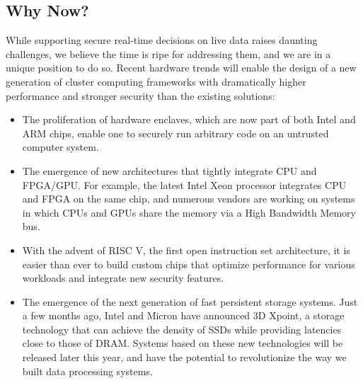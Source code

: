 \subsection{Why Now?}

While supporting secure real-time decisions on live data raises daunting challenges, we believe the time is ripe for addressing them, and we are in a unique position to do so. Recent hardware trends will enable the design of a new generation of cluster computing frameworks with dramatically higher performance and stronger security than the existing solutions: 

\begin{itemize}[noitemsep,topsep=0pt,parsep=0pt,partopsep=0pt]
\item The proliferation of hardware enclaves, which are now part of both Intel and ARM chips, enable one to securely run arbitrary code on an untrusted computer system.

\item The emergence of new architectures that tightly integrate CPU and FPGA/GPU. For example, the latest Intel Xeon processor integrates CPU and FPGA on the same chip, and numerous vendors are working on systems in which  CPUs and GPUs share the memory via a High Bandwidth Memory bus.  

\item With the advent of RISC V, the first open instruction set architecture, it is easier than ever to build custom chips that optimize performance for various workloads and integrate new security features.

\item The emergence of the next generation of fast persistent storage systems. Just a few months ago, Intel and Micron have announced 3D Xpoint, a storage technology that can achieve the density of SSDs while providing latencies close to those of DRAM. Systems based on these new technologies will be released later this year, and have the potential to revolutionize the way we built data processing systems.
\end{itemize}

